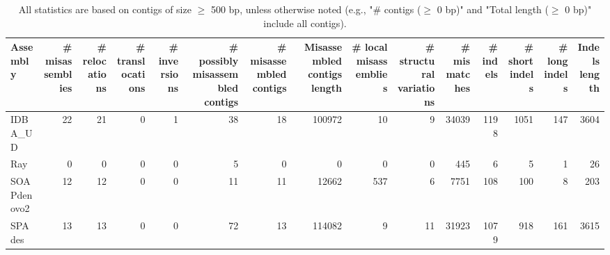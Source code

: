 \documentclass[12pt,a4paper]{article}
\begin{document}
\begin{table}[ht]
\begin{center}
\caption{All statistics are based on contigs of size $\geq$ 500 bp, unless otherwise noted (e.g., "\# contigs ($\geq$ 0 bp)" and "Total length ($\geq$ 0 bp)" include all contigs).}
\begin{tabular}{|l*{14}{|r}|}
\hline
Assembly & \# misassemblies &     \# relocations &     \# translocations &     \# inversions & \# possibly misassembled contigs & \# misassembled contigs & Misassembled contigs length & \# local misassemblies & \# structural variations & \# mismatches & \# indels &     \# short indels &     \# long indels & Indels length \\ \hline
IDBA\_UD & 22 & 21 & 0 & 1 & 38 & 18 & 100972 & 10 & 9 & 34039 & 1198 & 1051 & 147 & 3604 \\ \hline
Ray & 0 & 0 & 0 & 0 & 5 & 0 & 0 & 0 & 0 & 445 & 6 & 5 & 1 & 26 \\ \hline
SOAPdenovo2 & 12 & 12 & 0 & 0 & 11 & 11 & 12662 & 537 & 6 & 7751 & 108 & 100 & 8 & 203 \\ \hline
SPAdes & 13 & 13 & 0 & 0 & 72 & 13 & 114082 & 9 & 11 & 31923 & 1079 & 918 & 161 & 3615 \\ \hline
\end{tabular}
\end{center}
\end{table}
\end{document}
